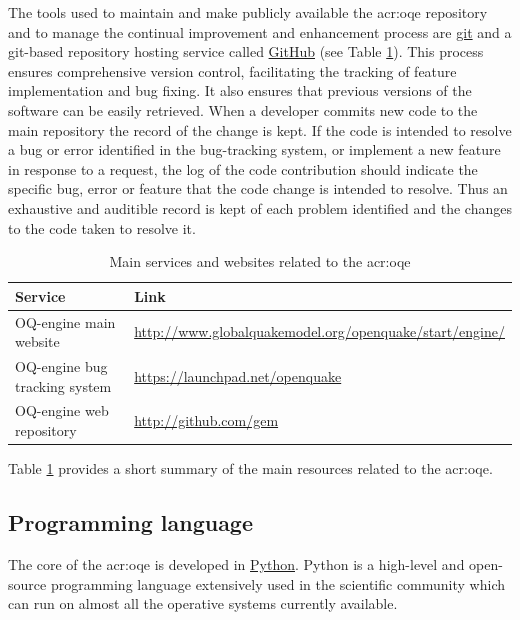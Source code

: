 The tools used to maintain and make publicly available the \gls{acr:oqe}
repository and to manage the continual improvement and enhancement process are
\href{http://git-scm.com/}{git} and a git-based repository hosting service
called \href{http://github.com/}{GitHub} (see Table
\ref{tab:development_tools}). 
This process ensures comprehensive version control, facilitating the tracking of
feature implementation and bug fixing. It also ensures that previous versions of
the software can be easily retrieved.  When a developer commits new code to the
main repository the record of the change is kept. If the code is intended to
resolve a bug or error identified in the bug-tracking system, or implement a new
feature in response to a request, the log of the code contribution should
indicate the specific bug, error or feature that the code change is intended to
resolve. 
%
Thus an exhaustive and auditible record is kept of each problem
identified and the changes to the code taken to resolve it.
%
\begin{table}[!t]
\centering
\caption{Main services and websites related to the \gls{acr:oqe}}
\begin{tabular}{p{4cm}p{9cm}}
\hline
\rowcolor{anti-flashwhite}
\bf{Service} & \bf{Link}  \\
\hline 
OQ-engine main website & 
    \href{http://www.globalquakemodel.org/openquake/start/engine/}
        {http://www.globalquakemodel.org/openquake/start/engine/} \\
OQ-engine bug tracking system & 
    \href{https://launchpad.net/openquake}{https://launchpad.net/openquake} \\
OQ-engine web repository & 
    \href{http://github.com/gem}{http://github.com/gem} \\
\hline
\end{tabular}
\label{tab:development_tools}
\end{table}
Table \ref{tab:development_tools} provides a short summary of the main 
resources related to the \gls{acr:oqe}.
%
\subsection{Programming language}
The core of the \gls{acr:oqe} is developed in 
\href{https://www.python.org/}{Python}. Python is a high-level and open-source
programming language extensively used in the scientific community 
which can run on almost all the operative systems currently available.
%
